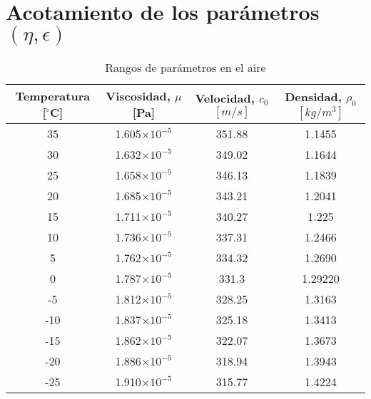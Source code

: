\chapter{Acotamiento de los parámetros $(\eta, \epsilon)$}\label{app3}


\begin{table}[hbpt]
\small
\centering
\caption{Rangos de parámetros en el aire}
\begin{tabular}{cccc}
\hline
Temperatura [$^{\circ}$C]& Viscosidad, $\mu$ [Pa] & Velocidad, $c_0$ $[m/s]$& Densidad, $\rho_0$ $[kg/m^3]$\\
\hline
35 & 1.605$\times 10^{-5}$ & 351.88 & 1.1455 \\
30 & 1.632$\times 10^{-5}$ & 349.02 & 1.1644 \\ 
25 & 1.658$\times 10^{-5}$ & 346.13 & 1.1839 \\ 
20 & 1.685$\times 10^{-5}$ & 343.21 & 1.2041 \\ 
15 & 1.711$\times 10^{-5}$ & 340.27 & 1.225 \\ 
10 & 1.736$\times 10^{-5}$ & 337.31 & 1.2466 \\ 
5 & 1.762$\times 10^{-5}$ & 334.32 & 1.2690 \\ 
0 & 1.787$\times 10^{-5}$ & 331.3 & 1.29220 \\ 
-5 & 1.812$\times 10^{-5}$ & 328.25 & 1.3163 \\ 
-10 & 1.837$\times 10^{-5}$ & 325.18 & 1.3413 \\ 
-15 & 1.862$\times 10^{-5}$ & 322.07 & 1.3673 \\ 
-20 & 1.886$\times 10^{-5}$ & 318.94 & 1.3943 \\ 
-25 & 1.910$\times 10^{-5}$ & 315.77 & 1.4224 \\ 
\hline
\end{tabular}
\label{tab:app3}
\end{table}
